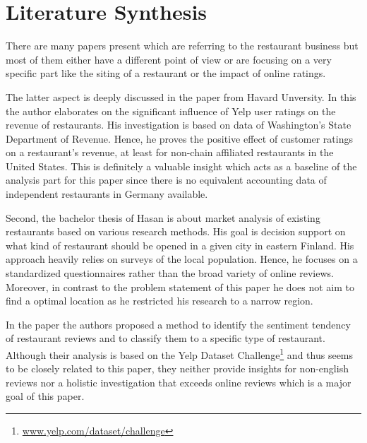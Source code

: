 \section{Literature Synthesis}
\label{sec:synthesis}
There are many papers present which are referring to the restaurant business but most of them either have a different point of view or are focusing on a very specific part like the siting of a restaurant or the impact of online ratings.

The latter aspect is deeply discussed in the paper from Havard Unversity\cite{CaseOfYelp}. In this the author elaborates on the significant influence of Yelp user ratings on the revenue of restaurants. His investigation is based on data of Washington’s State Department of Revenue. Hence, he proves the positive effect of customer ratings on a restaurant's revenue, at least for non-chain affiliated restaurants in the United States. This is definitely a valuable insight which acts as a baseline of the analysis part for this paper since there is no equivalent accounting data of independent restaurants in Germany available. 

Second, the bachelor thesis of Hasan\cite{Imatra} is about market analysis of existing restaurants based on various research methods. His goal is decision support on what kind of restaurant should be opened in a given city in eastern Finland. His approach heavily relies on surveys of the local population. Hence, he focuses on a standardized questionnaires rather than the broad variety of online reviews. Moreover, in contrast to the problem statement of this paper he does not aim to find a optimal location as he restricted his research to a narrow region. 

In the paper \cite{SentimentAnalysis} the authors proposed a method to identify the sentiment tendency of restaurant reviews and to classify them to a specific type of restaurant. Although their analysis is based on the Yelp Dataset Challenge\footnote{\href{https://www.yelp.com/dataset/challenge}{www.yelp.com/dataset/challenge}} and thus seems to be closely related to this paper, they neither provide insights for non-english reviews nor a holistic investigation that exceeds online reviews which is a major goal of this paper.
